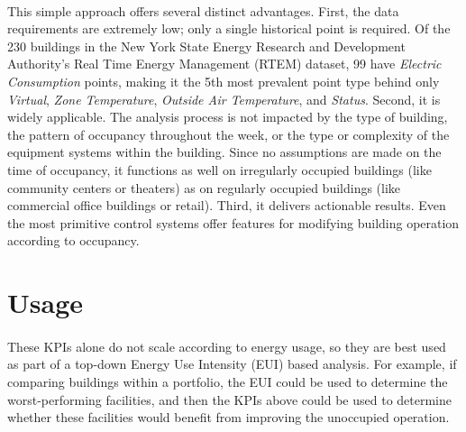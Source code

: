 \documentclass[a4paper]{article}
\begin{document}
\paragraph{}
This simple approach offers several distinct advantages. First, the data requirements are extremely low; only a single historical point is required. Of the 230 buildings in the New York State Energy Research and Development Authority's Real Time Energy Management (RTEM) dataset, 99 have \textit{Electric Consumption} points, making it the 5th most prevalent point type behind only  \textit{Virtual}, \textit{Zone Temperature}, \textit{Outside Air Temperature}, and \textit{Status}. Second, it is widely applicable. The analysis process is not impacted by the type of building, the pattern of occupancy throughout the week, or the type or complexity of the equipment systems within the building. Since no assumptions are made on the time of occupancy, it functions as well on irregularly occupied buildings (like community centers or theaters) as on regularly occupied buildings (like commercial office buildings or retail). Third, it delivers actionable results. Even the most primitive control systems offer features for modifying building operation according to occupancy.

\section{Usage}

\paragraph{}
These KPIs alone do not scale according to energy usage, so they are best used as part of a top-down Energy Use Intensity (EUI) based analysis. For example, if comparing buildings within a portfolio, the EUI could be used to determine the worst-performing facilities, and then the KPIs above could be used to determine whether these facilities would benefit from improving the unoccupied operation.
\end{document}
